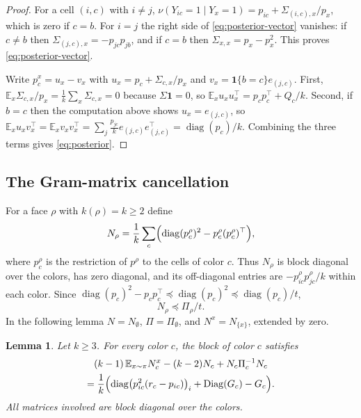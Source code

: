 \documentclass{amsart}
\numberwithin{equation}{section}
\theoremstyle{plain}
\newtheorem{lemma}[theorem]{Lemma}
\theoremstyle{definition}
\theoremstyle{remark}
\newcommand{\E}{\mathbb{E}}
\newcommand{\diag}{\operatorname{diag}}
\newcommand{\Diag}{\operatorname{Diag}}
\newcommand{\T}{\top}
\newcommand{\one}{\mathbf{1}}
\begin{document}
\begin{proof}
For a cell $(i,c)$ with $i\ne j$, $\nu(Y_{ic}=1\mid Y_x=1)=p_{ic}+\Sigma_{(i,c),x}/p_x$, which is zero if $c=b$. For $i=j$ the right side of \eqref{eq:posterior-vector} vanishes: if $c\ne b$ then $\Sigma_{(j,c),x}=-p_{jc}p_{jb}$, and if $c=b$ then $\Sigma_{x,x}=p_x-p_x^2$. This proves \eqref{eq:posterior-vector}.

Write $p^x_c=u_x-v_x$ with $u_x=p_c+\Sigma_{c,x}/p_x$ and $v_x=\one\{b=c\}e_{(j,c)}$. First, $\E_x\Sigma_{c,x}/p_x=\frac1k\sum_x\Sigma_{c,x}=0$ because $\Sigma\one=0$, so $\E_xu_xu_x^\T=p_cp_c^\T+Q_c/k$. Second, if $b=c$ then the computation above shows $u_x=e_{(j,c)}$, so $\E_xu_xv_x^\T=\E_xv_xv_x^\T=\sum_j\frac{p_{jc}}{k}e_{(j,c)}e_{(j,c)}^\T=\diag(p_c)/k$. Combining the three terms gives \eqref{eq:posterior}.
\end{proof}

\subsection{The Gram-matrix cancellation}
For a face $\rho$ with $k(\rho)=k\ge2$ define
\[
N_\rho=\frac1k\sum_c\Bigl(\diag(p^\rho_c)^2-p^\rho_c(p^\rho_c)^\T\Bigr),
\]
where $p^\rho_c$ is the restriction of $p^\rho$ to the cells of color $c$. Thus $N_\rho$ is block diagonal over the colors, has zero diagonal, and its off-diagonal entries are $-p^\rho_{ic}p^\rho_{jc}/k$ within each color. Since $\diag(p_c)^2-p_cp_c^\T\preceq\diag(p_c)^2\preceq\diag(p_c)/t$,
\begin{equation}\label{eq:N-upper}
N_\rho\preceq\Pi_\rho/t .
\end{equation}
In the following lemma $N=N_\emptyset$, $\Pi=\Pi_\emptyset$, and $N^x=N_{\{x\}}$, extended by zero.

\begin{lemma}\label{lem:gram}
Let $k\ge3$. For every color $c$, the block of color $c$ satisfies
\begin{multline*}
(k-1)\,\E_{x\sim\pi}N^x_c-(k-2)N_c+N_c\Pi_c^{-1}N_c\\
=\frac1k\Bigl(\diag\bigl(p_{ic}^2(r_c-p_{ic})\bigr)_i+\Diag(G_c)-G_c\Bigr).
\end{multline*}
All matrices involved are block diagonal over the colors.
\end{lemma}
\end{document}
